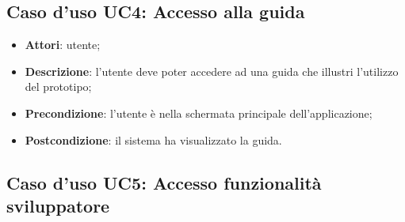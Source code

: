 \documentclass[../AnalisiDeiRequisiti.tex]{subfiles}
\begin{document}
\subsection{Caso d'uso UC4: Accesso alla guida}
\begin{itemize}
\item \textbf{Attori}: utente;
\item \textbf{Descrizione}: l'utente deve poter accedere ad una guida che illustri l'utilizzo del prototipo; 
      \item \textbf{Precondizione}: l'utente è nella schermata principale dell'applicazione;
    \item \textbf{Postcondizione}: il sistema ha visualizzato la guida.
  \end{itemize}
  \newpage
\hypertarget{UC5}{}
\subsection{Caso d'uso UC5: Accesso funzionalità sviluppatore}
\end{document}
